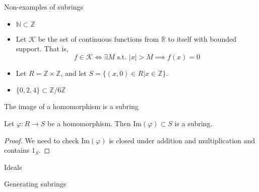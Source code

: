 \documentclass{beamer}
\newcommand{\Z}{\mathbb{Z}}
\begin{document}
\begin{frame}{Non-examples of subrings}

\begin{itemize}
\item $\mathbb{N}\subset\mathbb{Z}$ 
\item Let $\mathcal{K}$ be the set of continuous functions from $\mathbb{R}$ to itself with bounded support.  That is,
$$f\in \mathcal{K} \iff \exists M \textrm{ s.t. } |x|>M\implies  f(x)=0 $$
\item Let $R=\mathbb{Z}\times \mathbb{Z}$, and let $S=\{(x,0)\in R | x\in \mathbb{Z}\}$.  
\item $\{0,2,4\}\subset\Z/6\Z$
\end{itemize}
\end{frame}

\begin{frame}{The image of a homomorphism is a subring}

\begin{lemma} Let $\varphi:R\to S$ be a homomorphism.  Then $\textrm{Im}(\varphi)\subset S$ is a subring.
\end{lemma}

\begin{proof}
We need to check $\textrm{Im}(\varphi)$ is closed under addition and multiplication and contains $1_S$.
\end{proof}

\end{frame}

\begin{frame}[plain,c]

\begin{center}

\Huge

Ideals
\end{center}

\end{frame}


\begin{frame}[plain,c]

\begin{center}

\Huge

Generating subrings
\end{center}

\end{frame}
\end{document}
